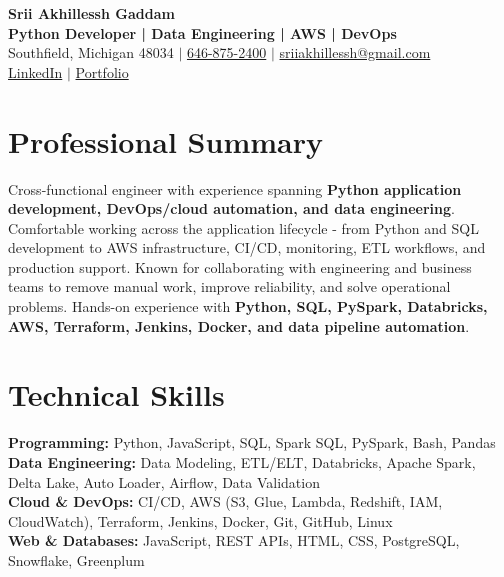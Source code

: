 \documentclass[letterpaper,10pt]{article}
\begin{document}
\fontsize{9.35pt}{10.45pt}\selectfont

\begin{center}
    {\LARGE \textbf{Srii Akhillessh Gaddam}} \\[-1pt]
    \textbf{Python Developer | Data Engineering | AWS | DevOps} \\[2pt]
    Southfield, Michigan 48034 $|$
    \href{tel:6468752400}{646-875-2400} $|$
    \href{mailto:sriiakhillessh@gmail.com}{sriiakhillessh@gmail.com} \\[1pt]
    \href{https://www.linkedin.com/in/srii-akhiilessh-gaddam-b48668191/}{LinkedIn} $|$
    \href{https://sriiakhillesshg.github.io/portfolio/}{Portfolio}
\end{center}
\vspace{-8pt}

\section{Professional Summary}
\small{Cross-functional engineer with experience spanning \textbf{Python application development, DevOps/cloud automation, and data engineering}. Comfortable working across the application lifecycle - from Python and SQL development to AWS infrastructure, CI/CD, monitoring, ETL workflows, and production support. Known for collaborating with engineering and business teams to remove manual work, improve reliability, and solve operational problems. Hands-on experience with \textbf{Python, SQL, PySpark, Databricks, AWS, Terraform, Jenkins, Docker, and data pipeline automation}.}

\section{Technical Skills}
\small{
\textbf{Programming:} Python, JavaScript, SQL, Spark SQL, PySpark, Bash, Pandas \\
\textbf{Data Engineering:} Data Modeling, ETL/ELT, Databricks, Apache Spark, Delta Lake, Auto Loader, Airflow, Data Validation \\
\textbf{Cloud \& DevOps:} CI/CD, AWS (S3, Glue, Lambda, Redshift, IAM, CloudWatch), Terraform, Jenkins, Docker, Git, GitHub, Linux \\
\textbf{Web \& Databases:} JavaScript, REST APIs, HTML, CSS, PostgreSQL, Snowflake, Greenplum
}
\end{document}
